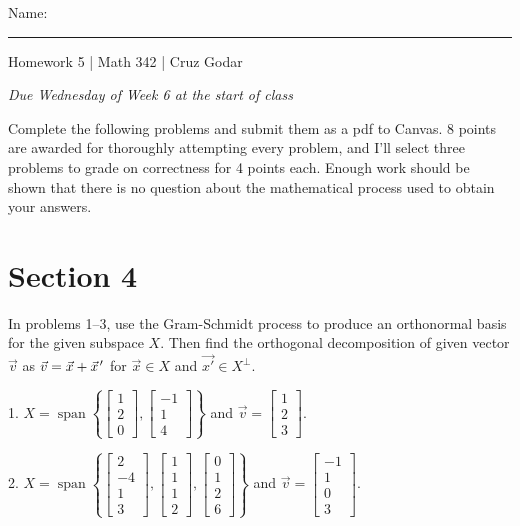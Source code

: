 \documentclass{article}
\begin{document}
\Large Name: \rule{2in}{0.15mm} \hfill Homework 5 | Math 342 | Cruz Godar \vspace{4pt}  \normalsize

\textit{Due Wednesday of Week 6 at the start of class}

Complete the following problems and submit them as a pdf to Canvas. 8 points are awarded for thoroughly attempting every problem, and I'll select three problems to grade on correctness for 4 points each. Enough work should be shown that there is no question about the mathematical process used to obtain your answers.

\section{Section 4}

In problems 1--3, use the Gram-Schmidt process to produce an orthonormal basis for the given subspace $X$. Then find the orthogonal decomposition of given vector $\vec{v}$ as $\vec{v} = \vec{x} + \vec{x}\hspace{0.1em}'$ for $\vec{x} \in X$ and $\vec{x'} \in X^\perp$.

1. $X = \operatorname{span}\left\{ \left[\begin{array}{c} 1 \\ 2 \\ 0 \end{array}\right], \left[\begin{array}{c} -1 \\ 1 \\ 4 \end{array}\right] \right\}$ and $\vec{v} = \left[\begin{array}{c} 1 \\ 2 \\ 3 \end{array}\right]$.

2. $X = \operatorname{span}\left\{ \left[\begin{array}{c} 2 \\ -4 \\ 1 \\ 3 \end{array}\right], \left[\begin{array}{c} 1 \\ 1 \\ 1 \\ 2 \end{array}\right], \left[\begin{array}{c} 0 \\ 1 \\ 2 \\ 6 \end{array}\right] \right\}$ and $\vec{v} = \left[\begin{array}{c} -1 \\ 1 \\ 0 \\ 3 \end{array}\right]$.
\end{document}
